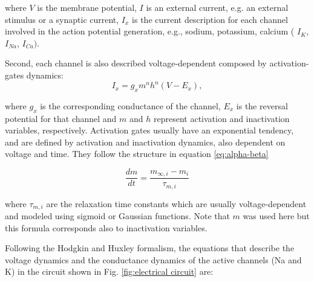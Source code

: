 where $V$ is the membrane potential, $I$ is an external current, e.g. an external stimulus or a synaptic current, $I_{x}$ is the current description for each channel involved in the action potential generation, e.g., sodium, potassium, calcium ( $I_K$, $I_{Na}$, $I_{Ca})$.

Second, each channel is also described voltage-dependent composed by activation-gates dynamics:
\begin{equation}
I_x =  g_x m^n h^n (V - E_x), 
\end{equation}

where $g_x$ is the corresponding conductance of the channel, $E_x$ is the reversal potential for that channel and $m$ and $h$ represent activation and inactivation variables, respectively.
Activation gates usually have an exponential tendency, and are defined by activation and inactivation dynamics, also dependent on voltage and time. They follow the structure in equation \ref{eq:alpha-beta}

\begin{equation}
	\label{eq:alpha-beta}
	\frac{dm}{dt} = \frac{m_{\infty,i}-m_i}{\tau_{m,i}}
\end{equation}

where $\tau_{m,i}$ are the relaxation time constants which are usually voltage-dependent and modeled using sigmoid or Gaussian functions. Note that $m$ was used here but this formula corresponds also to inactivation variables. 


Following the Hodgkin and Huxley formalism, 
the equations that describe the voltage dynamics and the conductance dynamics of the active channels (Na and K) in the circuit shown in Fig. \ref{fig:electrical circuit} are:

